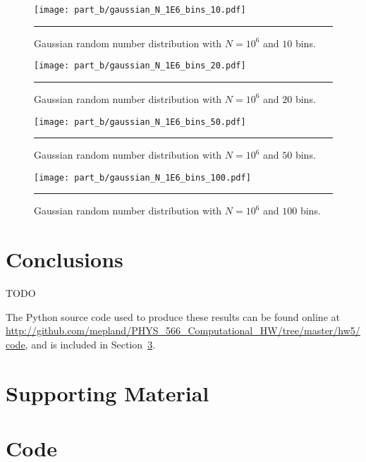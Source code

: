 \documentclass[notitlepage,aps,prd,nofootinbib]{revtex4-1}
\begin{document}
\clearpage

\begin{figure}[!htbc]
  \centering
  \texttt{[image: part\_b/gaussian\_N\_1E6\_bins\_10.pdf]}
	{\par\nobreak\rule[9pt]{35em}{0.5pt}\vspace{-5mm}}
	\caption{Gaussian random number distribution with $N = 10^6$ and $10$ bins.}
	\label{fig:gaussian_N_1E6_bins_10}
\end{figure}

\begin{figure}[!htbc]
  \centering
  \texttt{[image: part\_b/gaussian\_N\_1E6\_bins\_20.pdf]}
	{\par\nobreak\rule[9pt]{35em}{0.5pt}\vspace{-5mm}}
	\caption{Gaussian random number distribution with $N = 10^6$ and $20$ bins.}
	\label{fig:gaussian_N_1E6_bins_20}
\end{figure}

\begin{figure}[!htbc]
  \centering
  \texttt{[image: part\_b/gaussian\_N\_1E6\_bins\_50.pdf]}
	{\par\nobreak\rule[9pt]{35em}{0.5pt}\vspace{-5mm}}
	\caption{Gaussian random number distribution with $N = 10^6$ and $50$ bins.}
	\label{fig:gaussian_N_1E6_bins_50}
\end{figure}

\begin{figure}[!htbc]
  \centering
  \texttt{[image: part\_b/gaussian\_N\_1E6\_bins\_100.pdf]}
	{\par\nobreak\rule[9pt]{35em}{0.5pt}\vspace{-5mm}}
	\caption{Gaussian random number distribution with $N = 10^6$ and $100$ bins.}
	\label{fig:gaussian_N_1E6_bins_100}
\end{figure}



\clearpage
\section{Conclusions}
\label{sec:Conclusions}
TODO

The Python source code used to produce these results can be found online at \url{http://github.com/mepland/PHYS_566_Computational_HW/tree/master/hw5/code}, and is included in Section~\ref{sec:code}.


\clearpage
\section{Supporting Material}
\label{sec:Supporting_Material}




\clearpage


\clearpage
\section{Code}
\label{sec:code}


\end{document}
